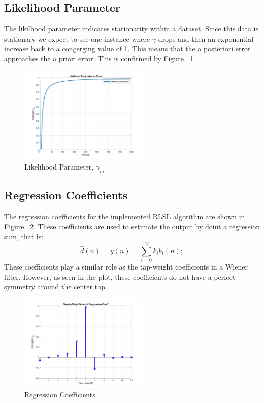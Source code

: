 \documentclass[journal]{IEEEtran}
\begin{document}
\subsection{Likelihood Parameter}
The likilhood parameter indicates stationarity within a dataset. Since this data is
stationary we expect to see one instance where $\gamma$ drops and then an exponential
increase back to a congerging value of 1. This means that the a posteriori error approaches the a priori error.
This is confirmed by Figure ~\ref{fig:likelihood}
\begin{figure}[H]
  \centering
  \captionsetup{justification=centering,font = small}
  \includegraphics[width=0.55\textwidth, inner] {Plots/Project3_LIKLIHOOD.jpg}
  \caption{Likelihood Parameter, $\gamma_m$}
    \label{fig:likelihood}
\end{figure}
\subsection{Regression Coefficients}
The regression coefficients for the implemented RLSL algorithm are shown in Figure ~\ref{fig:regcoeff}.
These coefficients are used to estimate the output by doint a regression sum, that is:
\begin{equation}
  \label{eq:regsum}
  \hat{d}(n)= y(n) = \sum_{i=0}^{M}k_ib_i(n);
\end{equation}
These coefficients play a similar role as the tap-weight coefficients in a Wiener filter. However, as seen in
the plot, these coefficients do not have a perfect symmetry around the center tap.
\begin{figure}[H]
  \centering
  \captionsetup{justification=centering,font = small}
  \includegraphics[width=0.55\textwidth, inner] {Plots/Project3_STEM.jpg}
  \caption{Regression Coefficients}
    \label{fig:regcoeff}
\end{figure}
\end{document}
